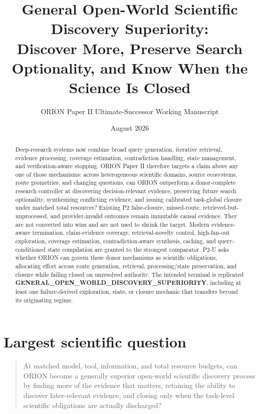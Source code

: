 \documentclass[11pt]{article}
\title{General Open-World Scientific Discovery Superiority:\\
Discover More, Preserve Search Optionality, and Know When the Science Is Closed}
\author{ORION Paper II Ultimate-Successor Working Manuscript}
\date{August 2026}
\begin{document}
\maketitle

\begin{abstract}
Deep-research systems now combine broad query generation, iterative retrieval, evidence processing, coverage estimation, contradiction handling, state management, and verification-aware stopping. ORION Paper II therefore targets a claim above any one of those mechanisms: across heterogeneous scientific domains, source ecosystems, route geometries, and changing questions, can ORION outperform a donor-complete research controller at discovering decision-relevant evidence, preserving future search optionality, synthesizing conflicting evidence, and issuing calibrated task-global closure under matched total resources? Existing P2 false-closure, missed-route, retrieved-but-unprocessed, and provider-invalid outcomes remain immutable causal evidence. They are not converted into wins and are not used to shrink the target. Modern evidence-aware termination, claim-evidence coverage, retrieval-novelty control, high-fan-out exploration, coverage estimation, contradiction-aware synthesis, caching, and query-conditioned state compilation are granted to the strongest comparator. P2-U asks whether ORION can govern these donor mechanisms as scientific obligations, allocating effort across route generation, retrieval, processing/state preservation, and closure while failing closed on unresolved authority. The intended terminal is replicated \textbf{GENERAL\_OPEN\_WORLD\_DISCOVERY\_SUPERIORITY}, including at least one failure-derived exploration, state, or closure mechanic that transfers beyond its originating regime.
\end{abstract}

\section{Largest scientific question}
\begin{quote}
At matched model, tool, information, and total resource budgets, can ORION become a generally superior open-world scientific discovery process by finding more of the evidence that matters, retaining the ability to discover later-relevant evidence, and closing only when the task-level scientific obligations are actually discharged?
\end{quote}
\end{document}
